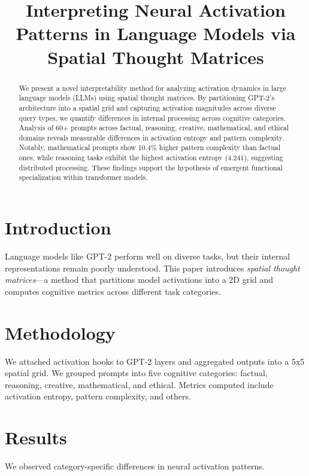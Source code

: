 \documentclass{article}
\title{Interpreting Neural Activation Patterns in Language Models via Spatial Thought Matrices}
\author{}
\date{}
\begin{document}
\maketitle

\begin{abstract}
We present a novel interpretability method for analyzing activation dynamics in large language models (LLMs) using spatial thought matrices. By partitioning GPT-2's architecture into a spatial grid and capturing activation magnitudes across diverse query types, we quantify differences in internal processing across cognitive categories. Analysis of 60+ prompts across factual, reasoning, creative, mathematical, and ethical domains reveals measurable differences in activation entropy and pattern complexity. Notably, mathematical prompts show 10.4\% higher pattern complexity than factual ones, while reasoning tasks exhibit the highest activation entropy (4.241), suggesting distributed processing. These findings support the hypothesis of emergent functional specialization within transformer models.
\end{abstract}

\section{Introduction}
Language models like GPT-2 perform well on diverse tasks, but their internal representations remain poorly understood. This paper introduces \emph{spatial thought matrices}—a method that partitions model activations into a 2D grid and computes cognitive metrics across different task categories.

\section{Methodology}
We attached activation hooks to GPT-2 layers and aggregated outputs into a 5x5 spatial grid. We grouped prompts into five cognitive categories: factual, reasoning, creative, mathematical, and ethical. Metrics computed include activation entropy, pattern complexity, and others.

\section{Results}
We observed category-specific differences in neural activation patterns.
\end{document}
